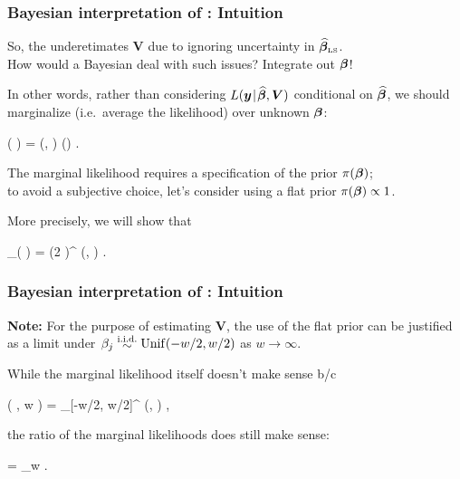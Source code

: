 \documentclass[18pt]{beamer}
\newcommand{\lse}[1]{\widehat{#1}_{\scriptsize \text{\tiny \rmfamily LS}}} %
\newcommand{\remlSubscr}{{\scriptsize \text{\tiny \rmfamily RL}}}
\newcommand{\frametitleText}{This is a frame title}
\begin{document}
\renewcommand{\frametitleText}{Bayesian interpretation of : Intuition}
\begin{frame}
\frametitle{\frametitleText}
So, the  underetimates $\bm{V}$ due to ignoring uncertainty in $\lse{\bbeta}$.\\
How would a Bayesian deal with such issues? Integrate out $\bm{\beta}$!

\pause
\smallskip
In other words, rather than considering 
$\likelihood(
	\by \given \widehat{\bbeta}, \bm{V}
)$
conditional on $\widehat{\bm{\beta}}$, we should marginalize (i.e.\ average the likelihood) over unknown $\bm{\beta}$:%
\begin{tightEquation*}
\likelihood(
	\by \given {}
)	
	= \int 
		\likelihood(\by \given \bbeta, ) \density(\bbeta) 
	\diff \bbeta.
\end{tightEquation*}

\pause
The marginal likelihood requires a specification of the prior $\operatorname{\pi}(\bm{\beta})$; \\
to avoid a subjective choice, let's consider using a flat prior $\operatorname{\pi}(\bm{\beta}) \propto 1$.

\smallskip
More precisely, we will show that
\begin{tightEquation*}
\likelihood_\remlSubscr(
	\by \given {}
)	
	= (2 \pi)^{} \! 
	\int 
		\likelihood(\by \given \bbeta, )
	\diff \bbeta.
\end{tightEquation*}
\end{frame}


\newcommand{\densityWidth}{w}
\begin{frame}
\frametitle{\frametitleText}
\textbf{Note:} For the purpose of estimating $\bm{V}$, the use of the flat prior can be justified as a limit under $\thinnerspace \beta_j \iidSim \unifDist(-\densityWidth/2, \densityWidth/2)$ as $\densityWidth \to \infty$.

\pause
\smallskip
While the marginal likelihood itself doesn't make sense b/c
\begin{tightEquation*}
\likelihood(
	\by \given {}, \densityWidth
)	
	= \frac{1}{\densityWidth^\nPred}
	\int_{[-\densityWidth/2, \densityWidth/2]^\nPred} 
		\likelihood(\by \given \bbeta, ) 
	\diff \bbeta
	,
\end{tightEquation*}
the ratio of the marginal likelihoods does still make sense:
\begin{tightEquation*}
	= \lim_{\densityWidth \to \infty}
		\frac{
			\likelihood(
				\by \given \bm{V}, \densityWidth
			)	
		}{
			\likelihood(
				\by \given \bm{V}', \densityWidth
			)	
		}.
\end{tightEquation*}
\end{frame}
\end{document}
